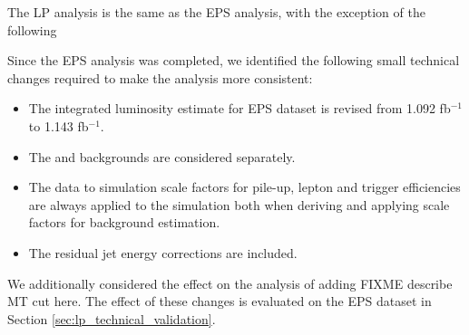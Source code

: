 
The LP analysis is the same as the EPS analysis, with the exception of the following


Since the EPS analysis was completed, we identified the following small technical
changes required to make the analysis more consistent:

\begin{itemize}
    \item The integrated luminosity estimate for EPS dataset is revised from 1.092 fb$^{-1}$ to 1.143 fb$^{-1}$.
    \item The \dytt and \dyll backgrounds are considered separately.
    \item The data to simulation scale factors for pile-up, lepton and trigger efficiencies are 
always applied to the simulation both when deriving and applying scale factors for background estimation.
    \item The residual jet energy corrections are included.
\end{itemize}

We additionally considered the effect on the analysis of adding FIXME describe MT cut here.
The effect of these changes is evaluated on the EPS dataset in Section \ref{sec:lp_technical_validation}.

